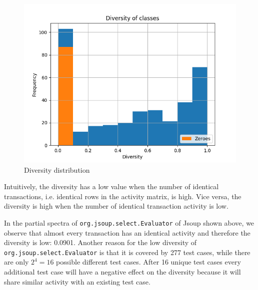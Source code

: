 \begin{figure}
    \centering
    \includegraphics[width=\linewidth]{figures/histogram_diversity}
    \caption{Diversity distribution}
    \label{fig:histogram_diversity}
\end{figure}

Intuitively, the diversity has a low value when the number of identical transactions, i.e. identical rows in the activity matrix, is high.
Vice versa, the diversity is high when the number of identical transaction activity is low.

\begin{table}[]
\scriptsize
\centering
\caption{My caption}
\label{my-label}
\noindent{}
\end{table}

In the partial spectra of \texttt{org.jsoup.select.Evaluator} of Jsoup shown above, we observe that almost every transaction has an identical activity and therefore the diversity is low: 0.0901.
Another reason for the low diversity of \texttt{org.jsoup.select.Evaluator} is that it is covered by 277 test cases, while there are only $2^4 = 16$ possible different test cases.
After 16 unique test cases every additional test case will have a negative effect on the diversity because it will share similar activity with an existing test case.

